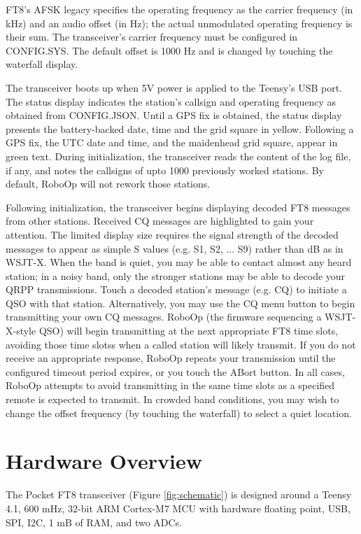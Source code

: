 \documentclass[10pt, letterpaper,]{article}
\begin{document}
FT8's AFSK legacy specifies the operating frequency as the carrier frequency (in kHz) and an audio offset (in Hz); the actual unmodulated operating frequency is their sum.
The transceiver's carrier frequency must be configured in CONFIG.SYS.
The default offset is 1000 Hz and is changed by touching the waterfall display.

The transceiver boots up when 5V power is applied to the Teensy's USB port.
The status display indicates the station's callsign and operating frequency as obtained from CONFIG.JSON.
Until a GPS fix is obtained, the status display presents the battery-backed date, time and the grid square in yellow.
Following a GPS fix, the UTC date and time, and the maidenhead grid square, appear in green text.
During initialization, the transceiver reads the content of the log file, if any, and notes the callsigns of upto 1000 previously worked stations.
By default, RoboOp will not rework those stations.

Following initialization, the transceiver begins displaying decoded FT8 messages from other stations.
Received CQ messages are highlighted to gain your attention.
The limited display size requires the signal strength of the decoded messages to appear as simple S values (e.g. S1, S2, ... S9) rather than dB as in WSJT-X.
When the band is quiet, you may be able to contact almost any heard station; in a noisy band, only the stronger stations may be able to decode your QRPP transmissions.
Touch a decoded station's message (e.g. CQ) to initiate a QSO with that station.
Alternatively, you may use the CQ menu button to begin transmitting your own CQ messages.
RoboOp (the firmware sequencing a WSJT-X-style QSO) will begin transmitting at the next appropriate FT8 time slots, avoiding those time slotss when a called station will likely transmit.
If you do not receive an appropriate response, RoboOp  repeats your transmission until the configured timeout period expires, or you touch the ABort button.
In all cases, RoboOp attempts to avoid transmitting in the same time slots as a specified remote is expected to transmit.
In crowded band conditions, you may wish to change the offset frequency (by touching the waterfall) to select a quiet location.




  
 \section*{Hardware Overview}
The Pocket FT8  transceiver (Figure \ref{fig:schematic}) is designed around a Teensy 4.1, 600 mHz, 32-bit ARM Cortex-M7 MCU with hardware floating point, USB, SPI, I2C, 1 mB of RAM, and two ADCs.
\end{document}
